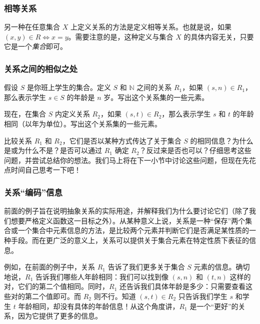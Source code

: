 \subsubsection*{相等关系}

\begin{example}
    另一种在任意集合 $X$ 上定义关系的方法是定义相等关系。也就是说，如果 $(x, y) \in R \iff x = y$。需要注意的是，这种定义与集合 $X$ 的具体内容无关，只要它是一个\emph{集合}即可。
\end{example}

\subsubsection*{关系之间的相似之处}

\begin{example}
    假设 $S$ 是你班上学生的集合。定义 $S$ 和 $\mathbb{N}$ 之间的关系 $R_1$，如果 $(s, n) \in R_1$，那么表示学生 $s \in S$ 的年龄是 $n$ 岁。写出这个关系集的一些元素。

    现在，在集合 $S$ 内定义关系 $R_2$，如果 $(s, t) \in R_2$，那么表示学生 $s$ 和 $t$ 的年龄相同（以年为单位）。写出这个关系集的一些元素。

    比较关系 $R_1$ 和 $R_2$，它们是否以某种方式传达了关于集合 $S$ 的相同信息？为什么是或为什么不是？是否可以通过 $R_1$ 确定 $R_2$？反过来是否也可以？仔细思考这些问题，并尝试总结你的想法。我们马上将在下一小节中讨论这些问题，但现在先花点时间自己思考一下吧！
\end{example}

\subsubsection*{关系``编码''信息}

前面的例子旨在说明抽象关系的实际用途，并解释我们为什么要讨论它们（除了我们想要严格定义函数这一目标之外）。从某种意义上说，关系是一种``保存''两个集合或一个集合中元素信息的方法，是比较两个元素并判断它们是否满足某性质的一种手段。而在更广泛的意义上，关系可以提供关于集合元素在特定性质下表征的信息。

例如，在前面的例子中，关系 $R_1$ 告诉了我们更多关于集合 $S$ 元素的信息。确切地说，$R_1$ 告诉我们哪些人年龄相同：我们可以找到像 $(s, n)$ 和 $(t, n)$ 这样的对，它们的第二个值相同。同时，$R_1$ 还告诉我们具体年龄是多少：只需要查看这些对的第二个值即可。而 $R_2$ 则不行。知道 $(s, t) \in R_2$ 只告诉我们学生 $s$ 和学生 $t$ 年龄相同，却没有具体的年龄信息！从这个角度讲，$R_1$ 是一个``更好''的关系，因为它提供了更多的信息。

